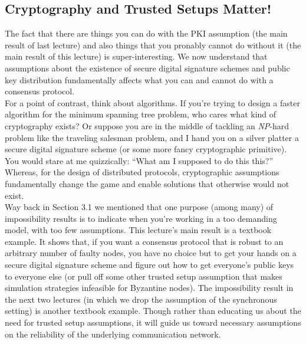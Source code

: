 \subsection{Cryptography and Trusted Setups Matter!}
The fact that there are things you can do with the PKI assumption (the main result of
last lecture) and also things that you pronably cannot do without it (the main result of this lecture) is
super-interesting. We now understand that assumptions about the existence of secure digital
signature schemes and public key distribution fundamentally affects what you can and cannot
do with a consensus protocol.\\
For a point of contrast, think about algorithms. If you’re trying to design a faster
algorithm for the minimum spanning tree problem, who cares what kind of cryptography
exists? Or suppose you are in the middle of tackling an \textit{NP}-hard problem like the traveling
salesman problem, and I hand you on a silver platter a secure digital signature scheme (or
some more fancy cryptographic primitive). You would stare at me quizzically: “What am I
supposed to do this this?” Whereas, for the design of distributed protocols, cryptographic
assumptions fundamentally change the game and enable solutions that otherwise would not
exist.\\
Way back in Section 3.1 we mentioned that one purpose (among many) of impossibility
results is to indicate when you’re working in a too demanding model, with too few assumptions. This lecture’s main result is a textbook example. It shows that, if you want
a consensus protocol that is robust to an arbitrary number of faulty nodes, you have no
choice but to get your hands on a secure digital signature scheme and figure out how to get
everyone’s public keys to everyone else (or pull off some other trusted setup assumption that
makes simulation strategies infeasible for Byzantine nodes). The impossibility result in the
next two lectures (in which we drop the assumption of the synchronous setting) is another
textbook example. Though rather than educating us about the need for trusted setup assumptions, it will guide us toward necessary assumptions on the reliability of the underlying communication network.

